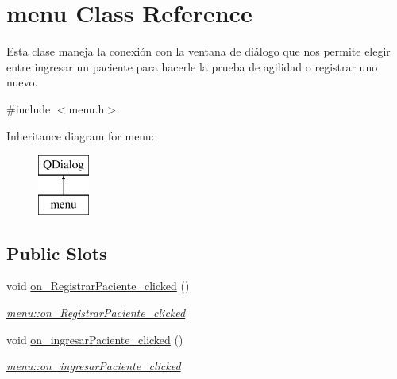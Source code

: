 \hypertarget{classmenu}{}\section{menu Class Reference}
\label{classmenu}


Esta clase maneja la conexión con la ventana de diálogo que nos permite elegir entre ingresar un paciente para hacerle la prueba de agilidad o registrar uno nuevo.  




{\ttfamily \#include $<$menu.\+h$>$}

Inheritance diagram for menu\+:\begin{figure}[H]
\begin{center}
\leavevmode
\includegraphics[height=2.000000cm]{classmenu}
\end{center}
\end{figure}
\subsection*{Public Slots}
\begin{DoxyCompactItemize}
\item 
void \hyperlink{classmenu_a4b63e5a7f04e55d65315f93980ba8a43}{on\+\_\+\+Registrar\+Paciente\+\_\+clicked} ()
\begin{DoxyCompactList}\small\item\em \hyperlink{classmenu_a4b63e5a7f04e55d65315f93980ba8a43}{menu\+::on\+\_\+\+Registrar\+Paciente\+\_\+clicked} \end{DoxyCompactList}\item 
void \hyperlink{classmenu_a62c11c56b58c852df09f28e2d47c82f6}{on\+\_\+ingresar\+Paciente\+\_\+clicked} ()
\begin{DoxyCompactList}\small\item\em \hyperlink{classmenu_a62c11c56b58c852df09f28e2d47c82f6}{menu\+::on\+\_\+ingresar\+Paciente\+\_\+clicked} \end{DoxyCompactList}\end{DoxyCompactItemize}
